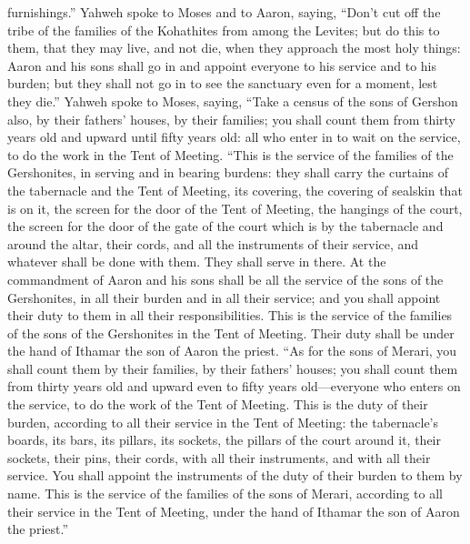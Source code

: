 furnishings.''  Yahweh spoke to Moses and to Aaron,
saying,  ``Don't cut off the tribe of the families of the
Kohathites from among the Levites;  but do this to them,
that they may live, and not die, when they approach the most holy
things: Aaron and his sons shall go in and appoint everyone to his
service and to his burden;  but they shall not go in to
see the sanctuary even for a moment, lest they die.'' 
Yahweh spoke to Moses, saying,  ``Take a census of the
sons of Gershon also, by their fathers' houses, by their families;
 you shall count them from thirty years old and upward
until fifty years old: all who enter in to wait on the service, to do
the work in the Tent of Meeting.  ``This is the service
of the families of the Gershonites, in serving and in bearing burdens:
 they shall carry the curtains of the tabernacle and the
Tent of Meeting, its covering, the covering of sealskin that is on it,
the screen for the door of the Tent of Meeting,  the
hangings of the court, the screen for the door of the gate of the court
which is by the tabernacle and around the altar, their cords, and all
the instruments of their service, and whatever shall be done with them.
They shall serve in there.  At the commandment of Aaron
and his sons shall be all the service of the sons of the Gershonites, in
all their burden and in all their service; and you shall appoint their
duty to them in all their responsibilities.  This is the
service of the families of the sons of the Gershonites in the Tent of
Meeting. Their duty shall be under the hand of Ithamar the son of Aaron
the priest.  ``As for the sons of Merari, you shall count
them by their families, by their fathers' houses;  you
shall count them from thirty years old and upward even to fifty years
old---everyone who enters on the service, to do the work of the Tent of
Meeting.  This is the duty of their burden, according to
all their service in the Tent of Meeting: the tabernacle's boards, its
bars, its pillars, its sockets,  the pillars of the court
around it, their sockets, their pins, their cords, with all their
instruments, and with all their service. You shall appoint the
instruments of the duty of their burden to them by name. 
This is the service of the families of the sons of Merari, according to
all their service in the Tent of Meeting, under the hand of Ithamar the
son of Aaron the priest.''

